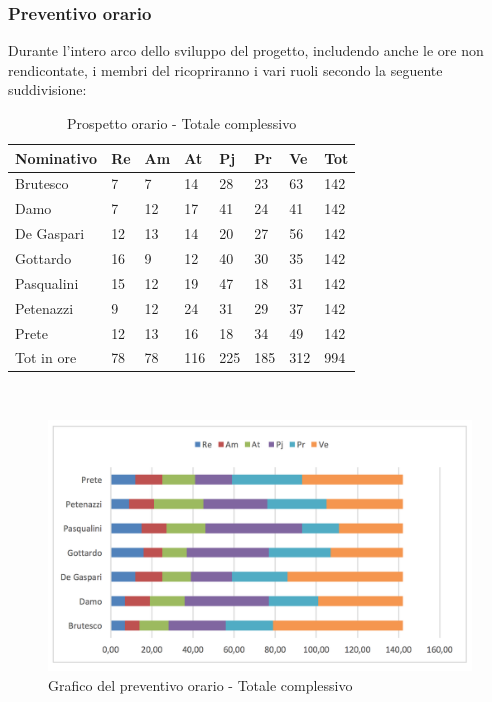 				\subsubsection {Preventivo orario}
		Durante l'intero arco dello sviluppo del progetto, includendo anche le ore non rendicontate, i membri del  ricopriranno i vari ruoli secondo la seguente suddivisione:\\

								\begin{table}[H] \begin{center} \begin{tabular}{llllllll}
								\toprule
								\textbf{Nominativo}	&	\textbf{Re}	&	\textbf{Am}	&	\textbf{At}	&	\textbf{Pj}	&	\textbf{Pr}	&	\textbf{Ve}	&	\textbf{Tot}\\
								\midrule
								Brutesco	&	7	&	7	&	14	&	28	&	23	&	63	&	142	 \\
								Damo	&	7	&	12	&	17	&	41	&	24	&	41	&	142	 \\
								De Gaspari	&	12	&	13	&	14	&	20	&	27	&	56	&	142	 \\
								Gottardo	&	16	&	9	&	12	&	40	&	30	&	35	&	142	 \\
								Pasqualini	&	15	&	12	&	19	&	47	&	18	&	31	&	142	 \\
								Petenazzi	&	9	&	12	&	24	&	31	&	29	&	37	&	142	 \\
								Prete	&	12	&	13	&	16	&	18	&	34	&	49	&	142	 \\
								\midrule
								Tot in ore	&	78	&	78	&	116	&	225	&	185	&	312	&	994	 \\



								\bottomrule
								\end{tabular} \end{center} \caption{Prospetto orario -
								Totale complessivo
								}\label{tab:h_TotaleComplessivo} \end{table}\mbox{}\\
                        		\begin{figure}[H]  \centering  \includegraphics[scale=0.40]{img/h_Totale}
										\caption{Grafico del preventivo orario - 								Totale complessivo	}  \label{fig:h_TotaleComplessivo} \end{figure}
